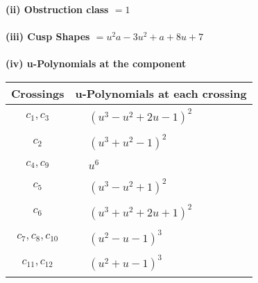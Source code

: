 \documentclass[1p]{elsarticle_modified}
\theoremstyle{definition}
\begin{document}
\flushleft \textbf{(ii) Obstruction class $= 1$}\\~\\
\flushleft \textbf{(iii) Cusp Shapes $= u^2 a-3 u^2+a+8 u+7$}\\~\\
\newpage\renewcommand{\arraystretch}{1}
\flushleft \textbf{(iv) u-Polynomials at the component}\newline \\
\begin{tabular}{m{50pt}|m{274pt}}
Crossings & \hspace{64pt}u-Polynomials at each crossing \\
\hline $$\begin{aligned}c_{1},c_{3}\end{aligned}$$&$\begin{aligned}
&(u^3- u^2+2 u-1)^2
\end{aligned}$\\
\hline $$\begin{aligned}c_{2}\end{aligned}$$&$\begin{aligned}
&(u^3+u^2-1)^2
\end{aligned}$\\
\hline $$\begin{aligned}c_{4},c_{9}\end{aligned}$$&$\begin{aligned}
&u^6
\end{aligned}$\\
\hline $$\begin{aligned}c_{5}\end{aligned}$$&$\begin{aligned}
&(u^3- u^2+1)^2
\end{aligned}$\\
\hline $$\begin{aligned}c_{6}\end{aligned}$$&$\begin{aligned}
&(u^3+u^2+2 u+1)^2
\end{aligned}$\\
\hline $$\begin{aligned}c_{7},c_{8},c_{10}\end{aligned}$$&$\begin{aligned}
&(u^2- u-1)^3
\end{aligned}$\\
\hline $$\begin{aligned}c_{11},c_{12}\end{aligned}$$&$\begin{aligned}
&(u^2+u-1)^3
\end{aligned}$\\
\hline
\end{tabular}\\~\\
\end{document}
